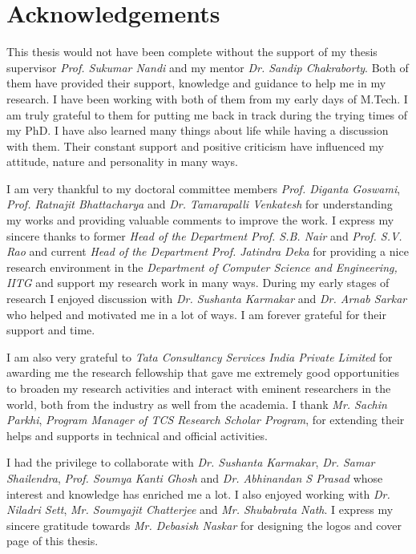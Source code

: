 \chapter*{\centering Acknowledgements}
\thispagestyle{cleanPage}
This thesis would not have been complete without the support of my thesis supervisor \textit{Prof. Sukumar Nandi} and my mentor \textit{Dr. Sandip Chakraborty}. Both of them have provided their support, knowledge and guidance to help me in my research. I have been working with both of them from my early days of M.Tech. I am truly grateful to them for putting me back in track during the trying times of my PhD. I have also learned many things about life while having a discussion with them. Their constant support and positive criticism have influenced my attitude, nature and personality in many ways.

I am very thankful to my doctoral committee members \textit{Prof. Diganta Goswami}, \textit{Prof. Ratnajit Bhattacharya} and \textit{Dr. Tamarapalli Venkatesh} for understanding my works and providing valuable comments to improve the work. I express my sincere thanks to former \textit{Head of the Department} \textit{Prof. S.B. Nair} and \textit{Prof. S.V. Rao} and current \textit{Head of the Department} \textit{Prof. Jatindra Deka} for providing a nice research environment in the \textit{Department of Computer Science and Engineering, IITG} and support my research work in many ways. During my early stages of research I enjoyed discussion with \textit{Dr. Sushanta Karmakar} and \textit{Dr. Arnab Sarkar} who helped and motivated me in a lot of ways. I am forever grateful for their support and time.

I am also very grateful to \textit{Tata Consultancy Services India Private Limited} for awarding me the research fellowship that gave me extremely good opportunities to broaden my research activities and interact with eminent researchers in the world, both from the industry as well from the academia. I thank \textit{Mr. Sachin Parkhi}, \textit{Program Manager of TCS Research Scholar Program}, for extending their helps and supports in technical and official activities. 

I had the privilege to collaborate with \textit{Dr. Sushanta Karmakar}, \textit{Dr. Samar Shailendra}, \textit{Prof. Soumya Kanti Ghosh} and \textit{Dr. Abhinandan S Prasad} whose interest and knowledge has enriched me a lot. I also enjoyed working with \textit{Dr. Niladri Sett}, \textit{Mr. Soumyajit Chatterjee} and \textit{Mr. Shubabrata Nath}. I express my sincere gratitude towards \textit{Mr. Debasish Naskar} for designing the logos and cover page of this thesis.

